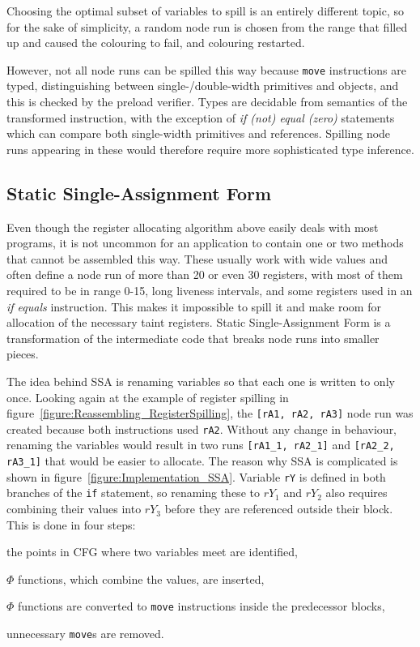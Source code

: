 \documentclass[12pt,twoside,notitlepage]{report}
\begin{document}
Choosing the optimal subset of variables to spill is an entirely different topic, so for the sake of simplicity, a random node run is chosen from the range that filled up and caused the colouring to fail, and colouring restarted.

However, not all node runs can be spilled this way because \texttt{move} instructions are typed, distinguishing between single-/double-width primitives and objects, and this is checked by the preload verifier. Types are decidable from semantics of the transformed instruction, with the exception of \emph{if (not) equal (zero)} statements which can compare both single-width primitives and references. Spilling node runs appearing in these would therefore require more sophisticated type inference.

\subsection{Static Single-Assignment Form}

Even though the register allocating algorithm above easily deals with most programs, it is not uncommon for an application to contain one or two methods that cannot be assembled this way. These usually work with wide values and often define a node run of more than 20 or even 30 registers, with most of them required to be in range 0-15, long liveness intervals, and some registers used in an \emph{if equals} instruction. This makes it impossible to spill it and make room for allocation of the necessary taint registers. Static Single-Assignment Form is a transformation of the intermediate code that breaks node runs into smaller pieces. 

The idea behind SSA is renaming variables so that each one is written to only once. Looking again at the example of register spilling in figure~\ref{figure:Reassembling_RegisterSpilling}, the \verb$[rA1, rA2, rA3]$ node run was created because both instructions used \verb$rA2$. Without any change in behaviour, renaming the variables would result in two runs \verb$[rA1_1, rA2_1]$ and \verb$[rA2_2, rA3_1]$ that would be easier to allocate. The reason why SSA is complicated is shown in figure~\ref{figure:Implementation_SSA}. Variable \verb$rY$ is defined in both branches of the \verb$if$ statement, so renaming these to $rY_1$ and $rY_2$ also requires combining their values into $rY_3$ before they are referenced outside their block. This is done in four steps: 
\begin{inparaenum}[(i)]
\item the points in CFG where two variables meet are identified,
\item $\Phi$ functions, which combine the values, are inserted,
\item $\Phi$ functions are converted to \texttt{move} instructions inside the predecessor blocks,
\item unnecessary \texttt{move}s are removed.
\end{inparaenum}
\end{document}
